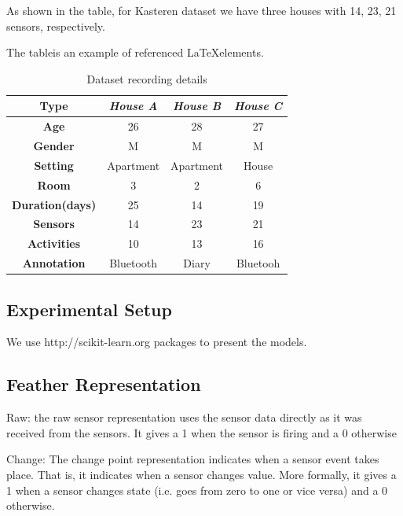 \documentclass[11pt, oneside]{article}   	%
\begin{document}
As shown in the table, for Kasteren dataset we have three houses with 14, 23, 21 sensors, respectively.

The tableis an example of referenced \LaTeX elements.
 
\begin{table}[t!]
\small
\begin{center}
\begin{tabular}{||c|c|c|c|||}
\hline
\textbf{Type} & \emph{House A} & \emph{House B} & \emph{House C}\\ \hline
\textbf{Age} & 26 & 28 & 27\\ \hline
\textbf{Gender} & M & M & M\\ \hline
\textbf{Setting} & Apartment & Apartment & House\\ \hline
\textbf{Room} & 3 & 2 & 6\\ \hline
\textbf{Duration(days)} & 25 & 14 & 19\\ \hline
\textbf{Sensors} & 14 & 23 & 21\\ \hline
\textbf{Activities} & 10 & 13 & 16\\ \hline
\textbf{Annotation} & Bluetooth & Diary & Bluetooh\\ \hline
\end{tabular}
\end{center}
\caption{Dataset recording details}
\label{table:fake-attacks}
\vspace{-0.3cm}
\end{table}


\subsection{Experimental Setup}

We use http://scikit-learn.org packages to present the models.



\subsection{Feather Representation}

Raw: the raw sensor representation uses the sensor data directly as it was received from the sensors. It gives a 1 when the sensor is firing and a 0 otherwise 


Change: The change point representation indicates when a sensor event takes place. That is, it indicates when a sensor changes value. More formally, it gives a 1 when a sensor changes state (i.e. goes from zero to one or vice versa) and a 0 otherwise.
\end{document}
